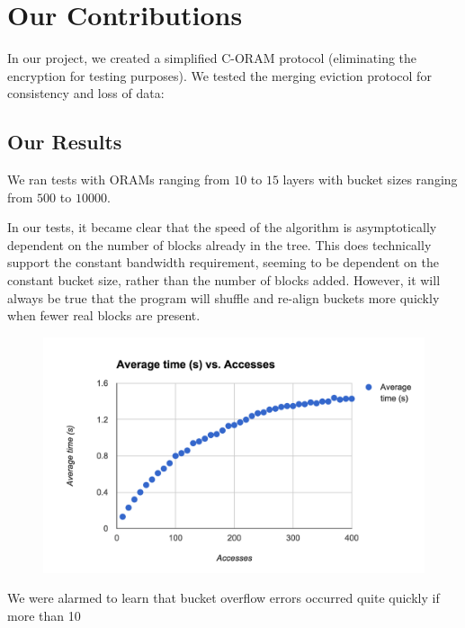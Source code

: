 \documentclass[12pt, oneside]{article}   	%
\begin{document}
\section{Our Contributions}

In our project, we created a simplified C-ORAM protocol (eliminating the encryption for testing purposes). We tested the merging eviction protocol for consistency and loss of data:

\subsection{Our Results}

We ran tests with ORAMs ranging from $10$ to $15$ layers with bucket sizes ranging from $500$ to $10000$.

In our tests, it became clear that the speed of the algorithm is asymptotically dependent on the number of blocks already in the tree. This does technically support the constant bandwidth requirement, seeming to be dependent on the constant bucket size, rather than the number of blocks added. However, it will always be true that the program will shuffle and re-align buckets more quickly when fewer real blocks are present.

\begin{figure}[h!]
  \includegraphics[width=\linewidth]{runtimegraph}
  \caption{}
  \label{fig:runtimegraph}
\end{figure}


We were alarmed to learn that bucket overflow errors occurred quite quickly if more than 10%
\end{document}
